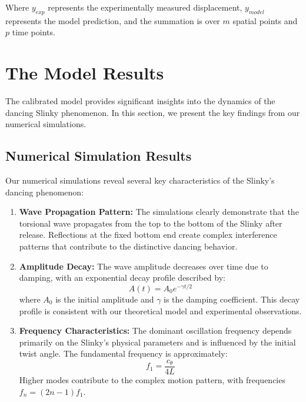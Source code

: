 \documentclass{mcmthesis}  %
\begin{document}
Where $y_{exp}$ represents the experimentally measured displacement, $y_{model}$ represents the model prediction, and the summation is over $m$ spatial points and $p$ time points.

\section{The Model Results}  %

The calibrated model provides significant insights into the dynamics of the dancing Slinky phenomenon. In this section, we present the key findings from our numerical simulations.

\subsection{Numerical Simulation Results}
Our numerical simulations reveal several key characteristics of the Slinky's dancing phenomenon:

\begin{enumerate}
    \item \textbf{Wave Propagation Pattern:} The simulations clearly demonstrate that the torsional wave propagates from the top to the bottom of the Slinky after release. Reflections at the fixed bottom end create complex interference patterns that contribute to the distinctive dancing behavior.
    
    \item \textbf{Amplitude Decay:} The wave amplitude decreases over time due to damping, with an exponential decay profile described by:
    \begin{equation}
    A(t) = A_0 e^{-\gamma t/2}
    \end{equation}
    where $A_0$ is the initial amplitude and $\gamma$ is the damping coefficient. This decay profile is consistent with our theoretical model and experimental observations.
    
    \item \textbf{Frequency Characteristics:} The dominant oscillation frequency depends primarily on the Slinky's physical parameters and is influenced by the initial twist angle. The fundamental frequency is approximately:
    \begin{equation}
    f_1 = \frac{c_{\theta}}{4L}
    \end{equation}
    Higher modes contribute to the complex motion pattern, with frequencies $f_n = (2n-1)f_1$.
\end{enumerate}
\end{document}
